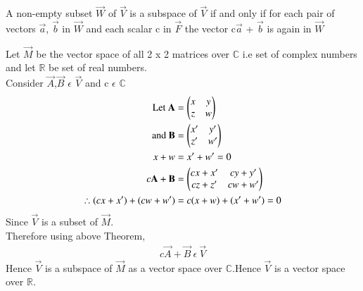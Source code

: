 A non-empty subset $\vec{W}$ of $\vec{V}$ is a subspace of $\vec{V}$ if and only
if for each pair of vectors $\vec{a}$, $\vec{b}$ in $\vec{W}$ and each scalar c in $\vec{F}$ the vector c$\vec{a}$ + $\vec{b}$ is again in $\vec{W}$

Let $\vec{M}$ be the vector space of all 2 x 2 matrices over $\mathbb{C}$ i.e set of complex numbers and let $\mathbb{R}$ be set of real numbers.
\\
Consider $\vec{A}$,$\vec{B}$ $\epsilon$ $\vec{V}$ and c $\epsilon$ $\mathbb{C}$
\begin{align}
\mbox{Let } \mathbf{A}&=\begin{pmatrix}x&y\\z&w\end{pmatrix}\\
\mbox{and } \mathbf{B}&= \begin{pmatrix}x'&y'\\z'&w'\end{pmatrix}\\
x+w&=x'+w'=0\\
c\mathbf{A}+\mathbf{B}&=\begin{pmatrix}cx+x'&cy+y'\\cz+z'&cw+w'\end{pmatrix}\\
\therefore (cx+x')+(cw+w') &= c(x+w)+(x'+w')=0
\end{align}
Since $\vec{V}$ is a subset of $\vec{M}$.\\Therefore using above Theorem,\\
\begin{align}
c\vec{A}+\vec{B} \ \epsilon \ \vec{V}
\end{align}
Hence $\vec{V}$ is a subspace of $\vec{M}$ as a vector space over $\mathbb{C}$.Hence $\vec{V}$ is a vector space over $\mathbb{R}$.

